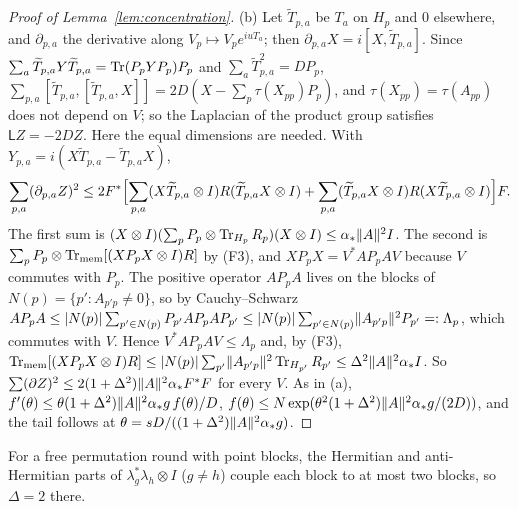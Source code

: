 \begin{proof}[Proof of Lemma~\ref{lem:concentration}]
(b) Let $\widetilde T_{p,a}$ be $T_a$ on $H_p$ and $0$ elsewhere, and $\partial_{p,a}$ the derivative along $V_p\mapsto V_pe^{iuT_a}$; then
$\partial_{p,a}X=i[X,\widetilde T_{p,a}]$. Since $\sum_a\widetilde T_{p,a}Y\widetilde T_{p,a}=\operatorname{Tr}(P_pYP_p)P_p$ and $\sum_a\widetilde T_{p,a}^2=DP_p$,
$\sum_{p,a}[\widetilde T_{p,a},[\widetilde T_{p,a},X]]=2D(X-\sum_p\tau(X_{pp})P_p)$, and $\tau(X_{pp})=\tau(A_{pp})$ does not depend on $V$; so the Laplacian of
the product group satisfies $\mathsf LZ=-2DZ$. Here the equal dimensions are needed. With $Y_{p,a}=i(X\widetilde T_{p,a}-\widetilde T_{p,a}X)$,
\[
\sum_{p,a}(\partial_{p,a}Z)^2\le2F^*\Bigl[\sum_{p,a}(X\widetilde T_{p,a}\otimes I)R(\widetilde T_{p,a}X\otimes I)+\sum_{p,a}(\widetilde T_{p,a}X\otimes I)R(X\widetilde T_{p,a}\otimes I)\Bigr]F .
\]
The first sum is $(X\otimes I)(\sum_pP_p\otimes\operatorname{Tr}_{H_p}R_p)(X\otimes I)\le\alpha_*\lVert A\rVert^2I$. The second is $\sum_pP_p\otimes\operatorname{Tr}_{\rm mem}[(XP_pX\otimes I)R]$ by (F3),
and $XP_pX=V^*AP_pAV$ because $V$ commutes with $P_p$. The positive operator $AP_pA$ lives on the blocks of $N(p)=\{p':A_{p'p}\ne0\}$, so by Cauchy--Schwarz
$AP_pA\le|N(p)|\sum_{p'\in N(p)}P_{p'}AP_pAP_{p'}\le|N(p)|\sum_{p'\in N(p)}\lVert A_{p'p}\rVert^2P_{p'}=:\Lambda_p$, which commutes with $V$. Hence $V^*AP_pAV\le\Lambda_p$
and, by (F3), $\operatorname{Tr}_{\rm mem}[(XP_pX\otimes I)R]\le|N(p)|\sum_{p'}\lVert A_{p'p}\rVert^2\operatorname{Tr}_{H_{p'}}R_{p'}\le\Delta^2\lVert A\rVert^2\alpha_*I$. So
$\sum(\partial Z)^2\le2(1+\Delta^2)\lVert A\rVert^2\alpha_*F^*F$ for every $V$. As in (a), $f'(\theta)\le\theta(1+\Delta^2)\lVert A\rVert^2\alpha_*g\,f(\theta)/D$,
$f(\theta)\le N\exp(\theta^2(1+\Delta^2)\lVert A\rVert^2\alpha_*g/(2D))$, and the tail follows at $\theta=sD/((1+\Delta^2)\lVert A\rVert^2\alpha_*g)$.
\end{proof}

For a free permutation round with point blocks, the Hermitian and anti-Hermitian parts of $\lambda_g^*\lambda_h\otimes I$ ($g\ne h$) couple each block to at
most two blocks, so $\Delta=2$ there.

